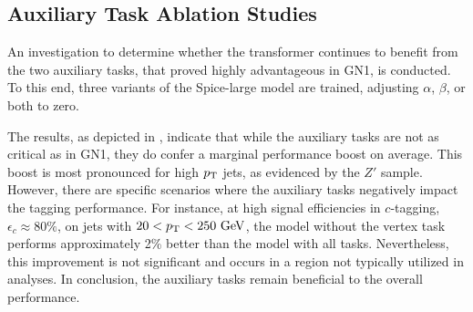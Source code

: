\subsection{Auxiliary Task Ablation Studies}

An investigation to determine whether the transformer continues to benefit from the two auxiliary tasks, that proved highly advantageous in GN1, is conducted.
To this end, three variants of the Spice-large model are trained, adjusting $\alpha$, $\beta$, or both to zero.

The results, as depicted in , indicate that while the auxiliary tasks are not as critical as in GN1, they do confer a marginal performance boost on average.
This boost is most pronounced for high $p_\mathrm{T}$ jets, as evidenced by the $Z'$ sample.
However, there are specific scenarios where the auxiliary tasks negatively impact the tagging performance.
For instance, at high signal efficiencies in $c$-tagging, $\epsilon_c \approx 80\%$, on jets with $20 < \pt < 250~\GeV$, the model without the vertex task performs approximately 2\% better than the model with all tasks.
Nevertheless, this improvement is not significant and occurs in a region not typically utilized in analyses.
In conclusion, the auxiliary tasks remain beneficial to the overall performance.

